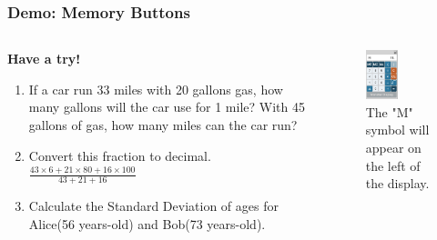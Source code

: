 \documentclass[
	11pt, %
]{beamer}
\begin{document}
\begin{frame}
	\frametitle{Demo: Memory Buttons}
	\begin{columns}[t]
	        \begin{column}{0.5\textwidth}
	        \textbf{Have a try!}
		        \begin{enumerate}
					\item If a car run 33 miles with 20 gallons gas, how many gallons will the car use for 1 mile? With 45 gallons of gas, how many miles can the car run? 
					\item Convert this fraction to decimal. $\frac{43 \times 6 + 21 \times 80 + 16 \times 100}{43 + 21 + 16}$
					\item Calculate the Standard Deviation of ages for Alice(56 years-old) and Bob(73 years-old).
				   \end{enumerate}
			\end{column}

			\begin{column}{0.5\textwidth}
			   \begin{figure}
				    \includegraphics[width=0.5\textwidth]{Memory_Buttons.png}
				    \caption{The "M" symbol will appear on the left of the display.}
			    \end{figure}
			\end{column}
	\end{columns}
\end{frame}

\end{document}
